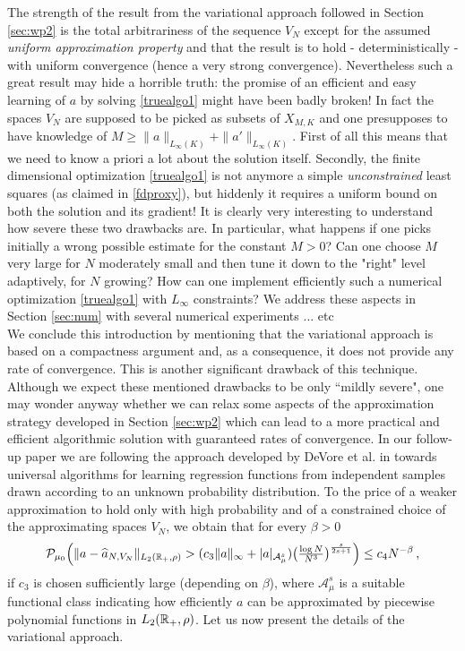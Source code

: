 The strength of the result from the variational approach followed in Section \ref{sec:wp2} is the total arbitrariness of the sequence $V_N$ except
for the assumed {\it uniform approximation property} and that the result is  to hold - deterministically - with uniform convergence (hence a very strong convergence). Nevertheless such 
a great result may  hide a horrible truth: the promise of an efficient and easy learning of $a$ by solving \eqref{truealgo1} might have been badly broken! In fact the spaces $V_N$ are supposed
to be picked as subsets of $X_{M,K}$ and one presupposes to have knowledge of $M \geq \|a\|_{L_{\infty}(K)} + \|a'\|_{L_{\infty}(K)}$. First of all this means that we need
to know a priori a lot about the solution itself. Secondly, the finite dimensional optimization \eqref{truealgo1} is not anymore a simple {\it unconstrained} least squares (as claimed in \eqref{fdproxy}),
but hiddenly it requires a uniform bound on both the solution and its gradient! It is clearly very interesting to understand how severe these two drawbacks are. In particular, what happens
if one picks initially a wrong possible estimate for the constant $M>0$? Can one choose $M$ very large for $N$ moderately small and then tune it  down to the "right" level adaptively, for $N$ growing?
How can one implement efficiently such a numerical optimization \eqref{truealgo1} with $L_\infty$ constraints?
We address these aspects in Section \ref{sec:num} with several numerical experiments ... etc
 \\

We conclude this introduction by mentioning that the variational approach is based on a compactness argument and, as a consequence, it does not provide any rate of convergence. This is another significant drawback of this technique.
\\

Although we expect these mentioned drawbacks to be only ``mildly severe", one may wonder anyway whether we can relax some aspects of the approximation strategy developed
in Section \ref{sec:wp2} which can lead to a more practical and efficient algorithmic solution with guaranteed rates of convergence.
In our follow-up paper \cite{bofohamaXX} we are following the approach developed by DeVore et al. in \cite{MR2249856,MR2327596} towards universal algorithms for learning regression functions from independent samples drawn according to an unknown probability distribution. To the  price of a  weaker approximation to hold only with high probability and of a constrained choice of the approximating spaces $V_N$, we obtain that for every $\beta>0$
	\begin{equation}\label{finalestimate}
		\mathcal P_{\mu_0} \Bigl(\|a- \widehat a_{N,V_N}\|_{L_2(\mathbb{R}_+,\rho)}
			>(c_3\|a\|_\infty+|a|_{\mathcal{A}^s_\mu})\bigl(\tfrac{\log N}{N^3}\bigr)^{\frac{s}{2s+1}}\Bigr)
			\leq c_4 N^{-\beta}\,,
	\end{equation}
	if $c_3$ is chosen sufficiently large (depending on $\beta$), where $\mathcal{A}^s_\mu$ is a suitable functional class indicating how efficiently $a$ can be approximated by piecewise polynomial functions in  $L_2(\mathbb{R}_+,\rho)$. Let us now present the details of the variational approach.